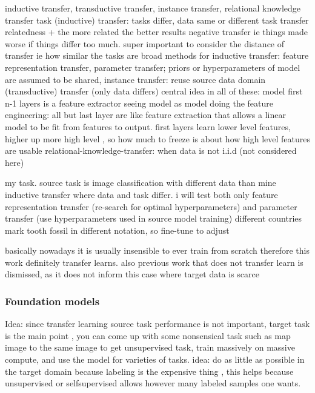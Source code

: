 \documentclass{article}
\begin{document}
inductive transfer, transductive transfer, instance transfer, relational knowledge transfer
task (inductive) transfer: tasks differ, data same or different
task transfer relatedness + the more related the better results
    negative transfer ie things made worse if things differ too much.
    super important to consider the distance of transfer ie how similar the tasks are
broad methods for inductive transfer: feature representation transfer, parameter transfer; priors or hyperparameters of model are assumed to be shared,
instance transfer: reuse source data
domain (transductive) transfer (only data differs)
central idea in all of these: model first n-1 layers is a feature extractor
seeing model as model doing the feature engineering: all but last layer are like 
feature extraction that allows a linear model to be fit from features to output.
    first layers learn lower level features, higher up more high level \cite{erhanWhyDoesUnsupervised2010}, so how much to freeze is about how
    high level features are usable     
relational-knowledge-transfer: when data is not i.i.d (not considered here)

my task. source task is image classification with different data than mine
inductive transfer where data and task differ.
i will test both only feature representation transfer (re-search for optimal hyperparameters)
and parameter transfer (use hyperparameters used in source model training)
different countries mark tooth fossil in different notation, so fine-tune to adjust

basically nowadays it is usually insensible to ever train from scratch \cite{cs231n_transfer_learning}
therefore this work definitely transfer learns. also previous work that does not transfer learn is dismissed, 
as it does not inform this case where target data is scarce

\subsubsection{Foundation models}


Idea: since transfer learning source task performance is not important, target task is the main point \cite{transferlearning_survey}, 
you can come up with some nonsensical task such as map image to the same image to get unsupervised task, train 
massively on massive compute, and use the model for varieties of tasks. idea: do as little as possible in the target domain
because labeling is the expensive thing \cite{engbook}, this helps because unsupervised or selfsupervised allows 
however many labeled samples one wants.
\end{document}
